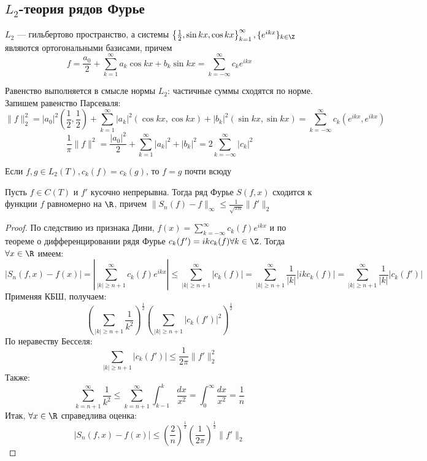 \subsection{\(L_2\)-теория рядов Фурье}
\(L_2\) --- гильбертово пространство, а системы \(\left\{ \frac{1}{2}, \sin kx, \cos kx \right\}_{k = 1}^\infty, \{e^{ikx}\}_{k \in \Z}\) являются ортогональными базисами, причем 
\[f = \frac{a_0}{2} + \sum_{k = 1}^\infty a_k\cos kx + b_k\sin kx = \sum_{k = -\infty}^\infty c_ke^{ikx}\]

Равенство выполняется в смысле нормы \(L_2\): частичные суммы сходятся по норме. Запишем равенство Парсеваля:
\[\|f\|_2^2 = |a_0|^2\left( \frac{1}{2}, \frac{1}{2} \right) + \sum_{k = 1}^\infty |a_k|^2 (\cos kx, \cos kx) + |b_k|^2 (\sin kx, \sin kx) = \sum_{k = -\infty}^\infty c_k \left( e^{ikx}, e^{ikx} \right)\]
\[\frac{1}{\pi}\|f\|^2 = \frac{|a_0|^2}{2} + \sum_{k = 1}^\infty |a_k|^2 + |b_k|^2 = 2\sum_{k = -\infty}^\infty |c_k|^2\]

\begin{corollary}
    Если \(f, g \in L_2(T), c_k(f) = c_k(g)\), то \(f = g\) почти всюду
\end{corollary}

\begin{theorem}
    Пусть \(f \in C(T)\) и \(f'\) кусочно непрерывна. Тогда ряд Фурье \(S(f, x)\) сходится к функции \(f\) равномерно на \(\R\), причем \(\|S_n(f) - f\|_\infty \le \frac{1}{\sqrt{\pi n}}\|f'\|_2\)
\end{theorem}
\begin{proof}
    По следствию из признака Дини, \(f(x) = \sum_{k = -\infty}^\infty c_k(f)e^{ikx}\) и по теореме о дифференцировании рядя Фурье \(c_k(f') = ik c_k(f) \forall k \in \Z\). Тогда \(\forall x \in \R\) имеем:
    \[|S_n(f, x) - f(x)| = \left| \sum_{|k| \ge n + 1}^\infty c_k(f)e^{ikx} \right| \le \sum_{|k| \ge n + 1}^\infty |c_k(f)| = \sum_{|k| \ge n + 1}^\infty \frac{1}{|k|}|ikc_k(f)| = \sum_{|k| \ge n + 1}^\infty \frac{1}{|k|}|c_k(f')|\]
    Применяя КБШ, получаем:
    \[\left( \sum_{|k| \ge n + 1} \frac{1}{k^2} \right)^{\frac{1}{2}}\left( \sum_{|k| \ge n + 1} |c_k(f')|^2 \right)^{\frac{1}{2}}\]
    По неравеству Бесселя:
    \[\sum_{|k| \ge n + 1} |c_k(f')| \le \frac{1}{2\pi}\|f'\|_2^2\]
    Также:
    \[\sum_{k = n + 1}^\infty \frac{1}{k^2} \le \sum_{k = n + 1}^\infty \int_{k - 1}^k \frac{dx}{x^2} = \int_0^\infty \frac{dx}{x^2} = \frac{1}{n}\]
    Итак, \(\forall x \in \R\) справедлива оценка:
    \[|S_n(f, x) - f(x)| \le \left( \frac{2}{n} \right)^{\frac{1}{2}}\left( \frac{1}{2\pi} \right)^{\frac{1}{2}}\|f'\|_2\]
\end{proof}

